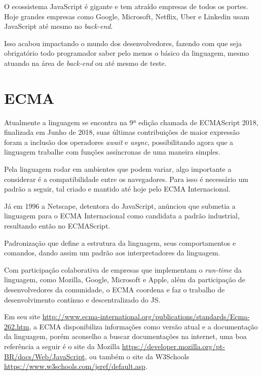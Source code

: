\documentclass[
	12pt,				%
	openright,			%
	twoside,			%
	a4paper,			%
	english,			%
	brazil				%
	]{abntex2}
\begin{document}
O ecossistema JavaScript é gigante e tem atraído empresas de todos os portes. Hoje grandes empresas como Google, Microsoft, Netflix, Uber e Linkedin usam JavaScript até mesmo no \textit{back-end}. 

Isso acabou impactando o mundo dos desenvolvedores, fazendo com que seja obrigatório todo programador saber pelo menos o básico da linguagem, mesmo atuando na área de \textit{back-end} ou até mesmo de teste.

\section{ECMA}
Atualmente a linguagem se encontra na 9ª edição chamada de ECMAScript 2018, finalizada em Junho de 2018, suas últimas contribuições de maior expressão foram a inclusão dos operadores \textit{await} e \textit{async}, possibilitando agora que a linguagem trabalhe com funções assíncronas de uma maneira simples. 

Pela linguagem rodar em ambientes que podem variar, algo importante a considerar é a compatibilidade entre os navegadores. Para isso é necessário um padrão a seguir, tal criado e mantido até hoje pelo ECMA Internacional.

Já em 1996 a Netscape, detentora do JavaScript, anúnciou que submetia a linguagem para o ECMA Internacional como candidata a padrão industrial, resultando então no ECMAScript.

Padronização que define a estrutura da linguagem, seus comportamentos e comandos, dando assim um padrão aos interpretadores da linguagem. 

Com participação colaborativa de empresas que implementam o \textit{run-time} da linguagem, como Mozilla, Google, Microsoft e Apple, além da participação de desenvolvedores da comunidade, o ECMA coordena e faz o trabalho de desenvolvimento contínuo e descentralizado do JS.

Em seu site \url{http://www.ecma-international.org/publications/standards/Ecma-262.htm}, a ECMA disponibiliza informações como versão atual e a documentação da linguagem, porém aconselho a buscar documentações na internet, uma boa referência a seguir é o site da Mozilla \url{https://developer.mozilla.org/pt-BR/docs/Web/JavaScript}, ou também o site da W3Schools \url{https://www.w3schools.com/jsref/default.asp}. 
\end{document}

